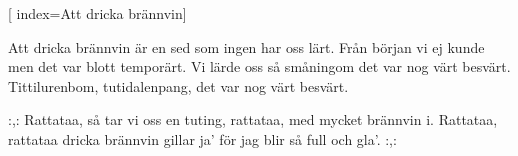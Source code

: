 [
	index={Att dricka brännvin}]		
	
\beginverse*						
Att dricka brännvin är en sed
som ingen har oss lärt.
Från början vi ej kunde 
men det var blott temporärt.
Vi lärde oss så småningom
det var nog värt besvärt.
Tittilurenbom, tutidalenpang,
det var nog värt besvärt.
\endverse						

\beginchorus				
:,: Rattataa, så tar vi oss en tuting,
rattataa, med mycket brännvin i.
Rattataa, rattataa
dricka brännvin gillar ja'
för jag blir så full och gla’. :,:
\endchorus				
\endsong		
